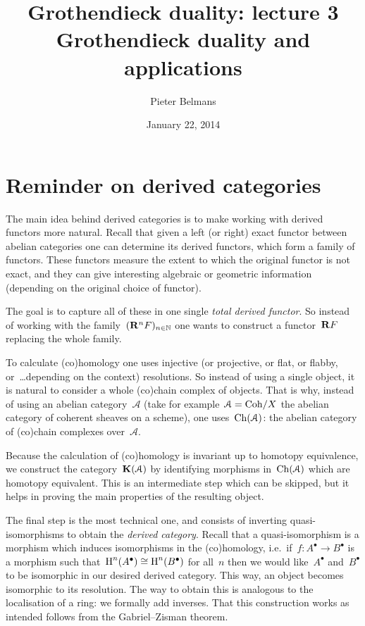 \documentclass[10pt,a4paper]{article}
\title{Grothendieck duality: lecture 3 \\[.2em] \Large Grothendieck duality and applications}
\author{Pieter Belmans}
\date{January 22, 2014}
\begin{document}
\maketitle

\begin{abstract}
  
\end{abstract}

\tableofcontents

\clearpage

\setcounter{section}{-1}
\section{Reminder on derived categories}
\label{section:derived-categories}
The main idea behind derived categories is to make working with derived functors more natural. Recall that given a left (or right) exact functor between abelian categories one can determine its derived functors, which form a family of functors. These functors measure the extent to which the original functor is not exact, and they can give interesting algebraic or geometric information (depending on the original choice of functor).

The goal is to capture all of these in one single \emph{total derived functor}. So instead of working with the family~$(\mathbf{R}^nF)_{n\in\mathbb{N}}$ one wants to construct a functor~$\mathbf{R} F$ replacing the whole family.

To calculate (co)homology one uses injective (or projective, or flat, or flabby, or~\dots depending on the context) resolutions. So instead of using a single object, it is natural to consider a whole (co)chain complex of objects. That is why, instead of using an abelian category~$\mathcal{A}$ (take for example~$\mathcal{A}=\mathrm{Coh}/X$ the abelian category of coherent sheaves on a scheme), one uses~$\operatorname{Ch}(\mathcal{A})$: the abelian category of (co)chain complexes over~$\mathcal{A}$.

Because the calculation of (co)homology is invariant up to homotopy equivalence, we construct the category~$\mathbf{K}(\mathcal{A})$ by identifying morphisms in~$\operatorname{Ch}(\mathcal{A})$ which are homotopy equivalent. This is an intermediate step which can be skipped, but it helps in proving the main properties of the resulting object.

The final step is the most technical one, and consists of inverting quasi-isomorphisms to obtain the \emph{derived category}. Recall that a quasi-isomorphism is a morphism which induces isomorphisms in the (co)homology, i.e.\ if~$f\colon A^\bullet\to B^\bullet$ is a morphism such that~$\operatorname{H}^n(A^\bullet)\cong\operatorname{H}^n(B^\bullet)$ for all~$n$ then we would like~$A^\bullet$ and~$B^\bullet$ to be isomorphic in our desired derived category. This way, an object becomes isomorphic to its resolution. The way to obtain this is analogous to the localisation of a ring: we formally add inverses. That this construction works as intended follows from the Gabriel--Zisman theorem.
\end{document}
